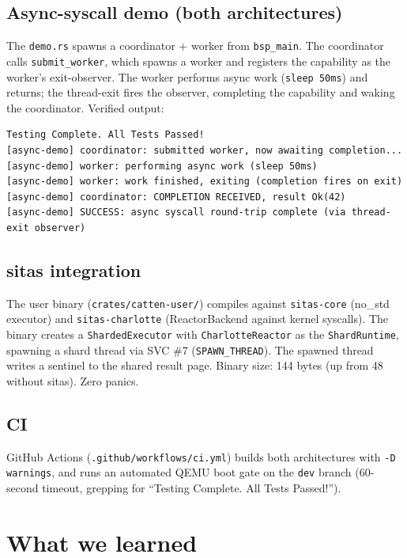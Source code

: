 \subsection{Async-syscall demo (both architectures)}

The \texttt{demo.rs} spawns a coordinator + worker from \texttt{bsp\_main}.
The coordinator calls \texttt{submit\_worker}, which spawns a worker and
registers the capability as the worker's exit-observer. The worker performs
async work (\texttt{sleep 50ms}) and returns; the thread-exit fires the
observer, completing the capability and waking the coordinator. Verified
output:

\begin{verbatim}
Testing Complete. All Tests Passed!
[async-demo] coordinator: submitted worker, now awaiting completion...
[async-demo] worker: performing async work (sleep 50ms)
[async-demo] worker: work finished, exiting (completion fires on exit)
[async-demo] coordinator: COMPLETION RECEIVED, result Ok(42)
[async-demo] SUCCESS: async syscall round-trip complete (via thread-exit observer)
\end{verbatim}

\subsection{sitas integration}

The user binary (\texttt{crates/catten-user/}) compiles against
\texttt{sitas-core} (no\_std executor) and \texttt{sitas-charlotte}
(ReactorBackend against kernel syscalls). The binary creates a
\texttt{ShardedExecutor} with \texttt{CharlotteReactor} as the
\texttt{ShardRuntime}, spawning a shard thread via SVC \#7
(\texttt{SPAWN\_THREAD}). The spawned thread writes a sentinel to the shared
result page. Binary size: 144 bytes (up from 48 without sitas). Zero panics.

\subsection{CI}

GitHub Actions (\texttt{.github/workflows/ci.yml}) builds both architectures
with \texttt{-D warnings}, and runs an automated QEMU boot gate on the
\texttt{dev} branch (60-second timeout, grepping for ``Testing Complete. All
Tests Passed!'').

\section{What we learned}

